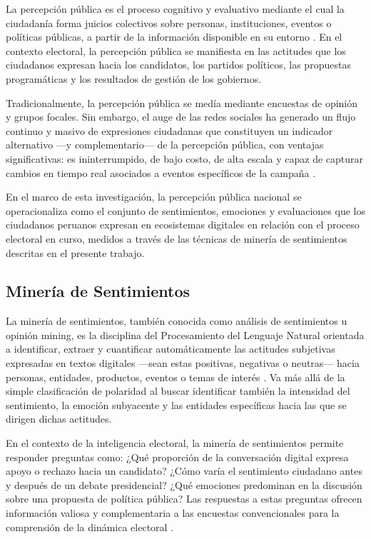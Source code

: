 \documentclass[listof=nochaptergap,12pt,times,authoryear]{report}
\begin{document}
La percepción pública es el proceso cognitivo y evaluativo mediante el cual la ciudadanía forma juicios colectivos sobre personas, instituciones, eventos o políticas públicas, a partir de la información disponible en su entorno \parencite{mc_lippmann1922public}. En el contexto electoral, la percepción pública se manifiesta en las actitudes que los ciudadanos expresan hacia los candidatos, los partidos políticos, las propuestas programáticas y los resultados de gestión de los gobiernos.
 
Tradicionalmente, la percepción pública se medía mediante encuestas de opinión y grupos focales. Sin embargo, el auge de las redes sociales ha generado un flujo continuo y masivo de expresiones ciudadanas que constituyen un indicador alternativo —y complementario— de la percepción pública, con ventajas significativas: es ininterrumpido, de bajo costo, de alta escala y capaz de capturar cambios en tiempo real asociados a eventos específicos de la campaña \parencite{mc_ceron2017social}.
 
En el marco de esta investigación, la percepción pública nacional se operacionaliza como el conjunto de sentimientos, emociones y evaluaciones que los ciudadanos peruanos expresan en ecosistemas digitales en relación con el proceso electoral en curso, medidos a través de las técnicas de minería de sentimientos descritas en el presente trabajo.
 
\subsection{Minería de Sentimientos}
 
La minería de sentimientos, también conocida como análisis de sentimientos u opinión mining, es la disciplina del Procesamiento del Lenguaje Natural orientada a identificar, extraer y cuantificar automáticamente las actitudes subjetivas expresadas en textos digitales —sean estas positivas, negativas o neutras— hacia personas, entidades, productos, eventos o temas de interés \parencite{mc_liu2012sentiment}. Va más allá de la simple clasificación de polaridad al buscar identificar también la intensidad del sentimiento, la emoción subyacente y las entidades específicas hacia las que se dirigen dichas actitudes.
 
En el contexto de la inteligencia electoral, la minería de sentimientos permite responder preguntas como: ¿Qué proporción de la conversación digital expresa apoyo o rechazo hacia un candidato? ¿Cómo varía el sentimiento ciudadano antes y después de un debate presidencial? ¿Qué emociones predominan en la discusión sobre una propuesta de política pública? Las respuestas a estas preguntas ofrecen información valiosa y complementaria a las encuestas convencionales para la comprensión de la dinámica electoral \parencite{mc_ceron2017social}.
 
\end{document}
